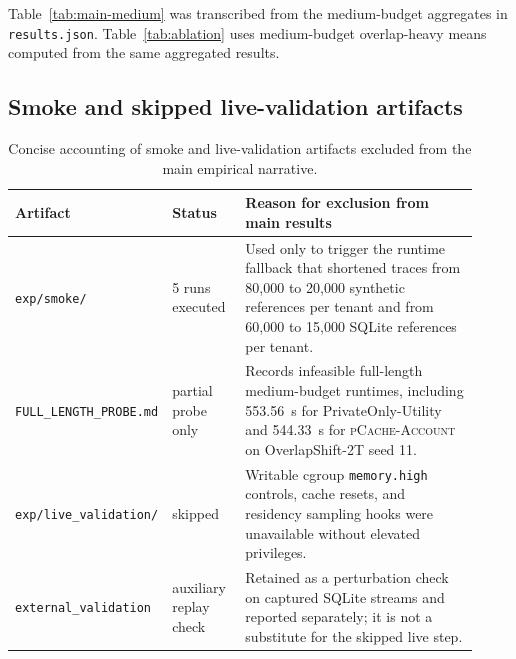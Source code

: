 \documentclass{article}
\newcommand{\pcache}{\textsc{pCache-Account}\xspace}
\begin{document}
Table~\ref{tab:main-medium} was transcribed from the medium-budget aggregates in \texttt{results.json}. Table~\ref{tab:ablation} uses medium-budget overlap-heavy means computed from the same aggregated results.

\subsection{Smoke and skipped live-validation artifacts}

\begin{table}[h]
\caption{Concise accounting of smoke and live-validation artifacts excluded from the main empirical narrative.}
\label{tab:excluded-artifacts}
\centering
\small
\scriptsize
\begin{tabular}{p{0.20\linewidth}p{0.16\linewidth}p{0.56\linewidth}}
\toprule
Artifact & Status & Reason for exclusion from main results \\
\midrule
\texttt{exp/smoke/} & 5 runs executed & Used only to trigger the runtime fallback that shortened traces from 80{,}000 to 20{,}000 synthetic references per tenant and from 60{,}000 to 15{,}000 SQLite references per tenant. \\
\texttt{FULL\_LENGTH\_PROBE.md} & partial probe only & Records infeasible full-length medium-budget runtimes, including 553.56~s for PrivateOnly-Utility and 544.33~s for \pcache on OverlapShift-2T seed 11. \\
\texttt{exp/live\_validation/} & skipped & Writable cgroup \texttt{memory.high} controls, cache resets, and residency sampling hooks were unavailable without elevated privileges. \\
\texttt{external\_validation} & auxiliary replay check & Retained as a perturbation check on captured SQLite streams and reported separately; it is not a substitute for the skipped live step. \\
\bottomrule
\end{tabular}
\end{table}
\end{document}
